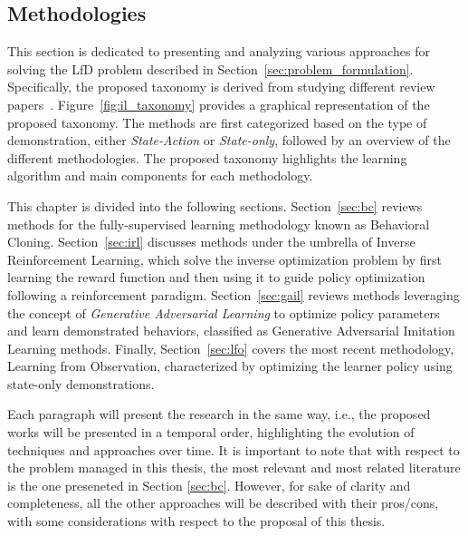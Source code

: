 \subsection{Methodologies}
\label{sec:lfd}
This section is dedicated to presenting and analyzing various approaches for solving the LfD problem described in Section~\ref{sec:problem_formulation}. Specifically,  the proposed taxonomy is derived from studying different review papers~\cite{kaelbling1996reinforcement_survey,argall2009robot_learning_from_demonstration,hussein2017imitation_learning_survey,fang2019survey,zheng2021imitation_progress_taxonomies_opportunities,zare2024survey}. Figure~\ref{fig:il_taxonomy} provides a graphical representation of the proposed taxonomy. The methods are first categorized based on the type of demonstration, either \textit{State-Action} or \textit{State-only}, followed by an overview of the different methodologies. The proposed taxonomy highlights the learning algorithm and main components for each methodology.

This chapter is divided into the following sections. Section~\ref{sec:bc} reviews methods for the fully-supervised learning methodology known as Behavioral Cloning. 
\newline Section~\ref{sec:irl} discusses methods under the umbrella of Inverse Reinforcement Learning, which solve the inverse optimization problem by first learning the reward function and then using it to guide policy optimization following a reinforcement paradigm.
\newline Section~\ref{sec:gail} reviews methods leveraging the concept of \textit{Generative Adversarial Learning} to optimize policy parameters and learn demonstrated behaviors, classified as Generative Adversarial Imitation Learning methods.
\newline Finally, Section~\ref{sec:lfo} covers the most recent methodology, Learning from Observation, characterized by optimizing the learner policy using state-only demonstrations.

Each paragraph will present the research in the same way, i.e., the proposed works will be presented in a temporal order, highlighting the evolution of techniques and approaches over time.
It is important to note that with respect to the problem managed in this thesis, the most relevant and most related literature is the one preseneted in Section \ref{sec:bc}. However, for sake of clarity and completeness, all the other approaches will be described with their pros/cons, with some considerations with respect to the proposal of this thesis.










